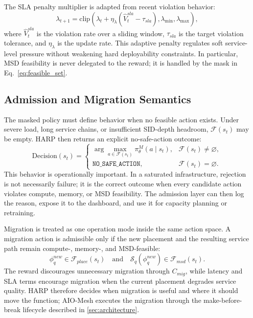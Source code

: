 \documentclass[final,5p]{elsarticle}
\begin{document}
The SLA penalty multiplier is adapted from recent violation behavior:
\begin{equation}
    \lambda_{t+1}
    =
    \mathrm{clip}
    \left(
    \lambda_t+\eta_\lambda(\hat{V}^{sla}_t-\tau_{sla}),
    \lambda_{\min},
    \lambda_{\max}
    \right),
    \label{eq:lambda_update}
\end{equation}
where \(\hat{V}^{sla}_t\) is the violation rate over a sliding window, \(\tau_{sla}\) is the target violation tolerance, and \(\eta_\lambda\) is the update rate. This adaptive penalty regulates soft service-level pressure without weakening hard deployability constraints. In particular, MSD feasibility is never delegated to the reward; it is handled by the mask in Eq.~\eqref{eq:feasible_set}.

\subsection{Admission and Migration Semantics}
\label{subsec:harp_admission}

The masked policy must define behavior when no feasible action exists. Under severe load, long service chains, or insufficient SID-depth headroom, \(\mathcal{F}(s_t)\) may be empty. HARP then returns an explicit no-safe-action outcome:
\begin{equation}
    \mathrm{Decision}(s_t)=
    \begin{cases}
        \arg\max_{a\in\mathcal{F}(s_t)}\pi_\theta^{M}(a\mid s_t),
        & \mathcal{F}(s_t)\neq\varnothing,\\
        \texttt{NO\_SAFE\_ACTION},
        & \mathcal{F}(s_t)=\varnothing.
    \end{cases}
\end{equation}
This behavior is operationally important. In a saturated infrastructure, rejection is not necessarily failure; it is the correct outcome when every candidate action violates compute, memory, or MSD feasibility. The admission layer can then log the reason, expose it to the dashboard, and use it for capacity planning or retraining.

Migration is treated as one operation mode inside the same action space. A migration action is admissible only if the new placement and the resulting service path remain compute-, memory-, and MSD-feasible:
\begin{equation}
    \phi_q^{new}\in\mathcal{F}_{place}(s_t)
    \quad\text{and}\quad
    \mathcal{S}_q(\phi_q^{new})\in\mathcal{F}_{msd}(s_t).
\end{equation}
The reward discourages unnecessary migration through \(C_{mig}\), while latency and SLA terms encourage migration when the current placement degrades service quality. HARP therefore decides when migration is useful and where it should move the function; AIO-Mesh executes the migration through the make-before-break lifecycle described in \autoref{sec:architecture}.
\end{document}
